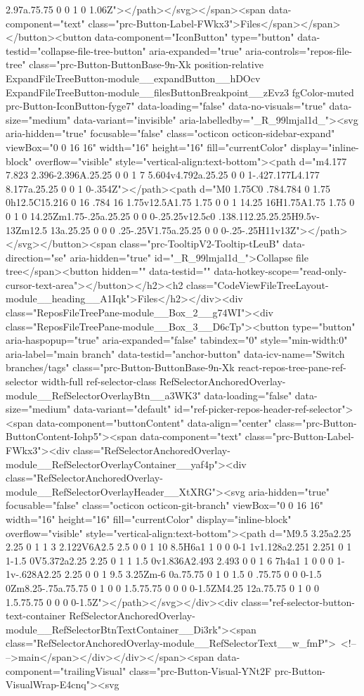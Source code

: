 {{{{{{{2.97a.75.75 0 0 1 0 1.06Z"></path></svg></span><span data-component="text" class="prc-Button-Label-FWkx3">Files</span></span></button><button data-component="IconButton" type="button" data-testid="collapse-file-tree-button" aria-expanded="true" aria-controls="repos-file-tree" class="prc-Button-ButtonBase-9n-Xk position-relative ExpandFileTreeButton-module__expandButton__hDOcv ExpandFileTreeButton-module__filesButtonBreakpoint__zEvz3 fgColor-muted prc-Button-IconButton-fyge7" data-loading="false" data-no-visuals="true" data-size="medium" data-variant="invisible" aria-labelledby="_R_99lmjal1d_"><svg aria-hidden="true" focusable="false" class="octicon octicon-sidebar-expand" viewBox="0 0 16 16" width="16" height="16" fill="currentColor" display="inline-block" overflow="visible" style="vertical-align:text-bottom"><path d="m4.177 7.823 2.396-2.396A.25.25 0 0 1 7 5.604v4.792a.25.25 0 0 1-.427.177L4.177 8.177a.25.25 0 0 1 0-.354Z"></path><path d="M0 1.75C0 .784.784 0 1.75 0h12.5C15.216 0 16 .784 16 1.75v12.5A1.75 1.75 0 0 1 14.25 16H1.75A1.75 1.75 0 0 1 0 14.25Zm1.75-.25a.25.25 0 0 0-.25.25v12.5c0 .138.112.25.25.25H9.5v-13Zm12.5 13a.25.25 0 0 0 .25-.25V1.75a.25.25 0 0 0-.25-.25H11v13Z"></path></svg></button><span class="prc-TooltipV2-Tooltip-tLeuB" data-direction="se" aria-hidden="true" id="_R_99lmjal1d_">Collapse file tree</span><button hidden="" data-testid="" data-hotkey-scope="read-only-cursor-text-area"></button></h2><h2 class="CodeViewFileTreeLayout-module__heading__A1Iqk">Files</h2></div><div class="ReposFileTreePane-module__Box_2__g74WI"><div class="ReposFileTreePane-module__Box_3__D6cTp"><button type="button" aria-haspopup="true" aria-expanded="false" tabindex="0" style="min-width:0" aria-label="main branch" data-testid="anchor-button" data-icv-name="Switch branches/tags" class="prc-Button-ButtonBase-9n-Xk react-repos-tree-pane-ref-selector width-full ref-selector-class RefSelectorAnchoredOverlay-module__RefSelectorOverlayBtn__a3WK3" data-loading="false" data-size="medium" data-variant="default" id="ref-picker-repos-header-ref-selector"><span data-component="buttonContent" data-align="center" class="prc-Button-ButtonContent-Iohp5"><span data-component="text" class="prc-Button-Label-FWkx3"><div class="RefSelectorAnchoredOverlay-module__RefSelectorOverlayContainer__yaf4p"><div class="RefSelectorAnchoredOverlay-module__RefSelectorOverlayHeader__XtXRG"><svg aria-hidden="true" focusable="false" class="octicon octicon-git-branch" viewBox="0 0 16 16" width="16" height="16" fill="currentColor" display="inline-block" overflow="visible" style="vertical-align:text-bottom"><path d="M9.5 3.25a2.25 2.25 0 1 1 3 2.122V6A2.5 2.5 0 0 1 10 8.5H6a1 1 0 0 0-1 1v1.128a2.251 2.251 0 1 1-1.5 0V5.372a2.25 2.25 0 1 1 1.5 0v1.836A2.493 2.493 0 0 1 6 7h4a1 1 0 0 0 1-1v-.628A2.25 2.25 0 0 1 9.5 3.25Zm-6 0a.75.75 0 1 0 1.5 0 .75.75 0 0 0-1.5 0Zm8.25-.75a.75.75 0 1 0 0 1.5.75.75 0 0 0 0-1.5ZM4.25 12a.75.75 0 1 0 0 1.5.75.75 0 0 0 0-1.5Z"></path></svg></div><div class="ref-selector-button-text-container RefSelectorAnchoredOverlay-module__RefSelectorBtnTextContainer__Di3rk"><span class="RefSelectorAnchoredOverlay-module__RefSelectorText__w_fmP"> <!-- -->main</span></div></div></span><span data-component="trailingVisual" class="prc-Button-Visual-YNt2F prc-Button-VisualWrap-E4cnq"><svg }}}}}}}
